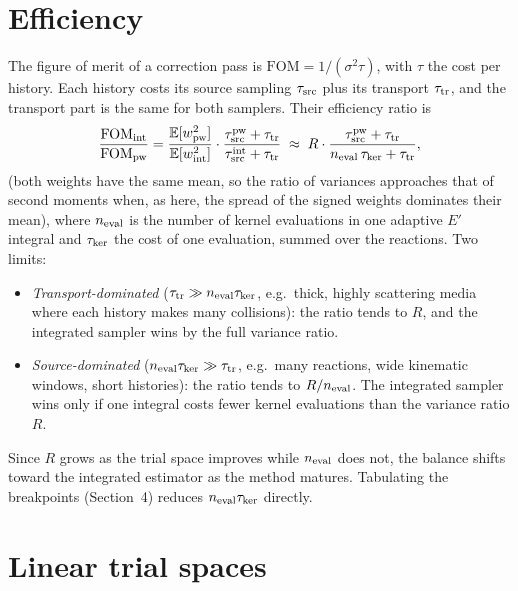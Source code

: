\documentclass[11pt]{article}
\newcommand{\E}{\mathbb{E}}
\begin{document}
\section{Efficiency}

The figure of merit of a correction pass is $\mathrm{FOM} = 1/(\sigma^2\tau)$, with
$\tau$ the cost per history. Each history costs its source sampling $\tau_{\rm src}$
plus its transport $\tau_{\rm tr}$, and the transport part is the same for both
samplers. Their efficiency ratio is
\begin{equation}
  \frac{\mathrm{FOM}_{\rm int}}{\mathrm{FOM}_{\rm pw}}
  = \frac{\E[w_{\rm pw}^2]}{\E[w_{\rm int}^2]}\cdot
    \frac{\tau^{\rm pw}_{\rm src}+\tau_{\rm tr}}{\tau^{\rm int}_{\rm src}+\tau_{\rm tr}}
  \;\approx\; R\cdot\frac{\tau^{\rm pw}_{\rm src}+\tau_{\rm tr}}
  {n_{\rm eval}\,\tau_{\rm ker}+\tau_{\rm tr}},
  \label{eq:fom}
\end{equation}
(both weights have the same mean, so the ratio of variances approaches that of second
moments when, as here, the spread of the signed weights dominates their mean), where
$n_{\rm eval}$ is the number of kernel evaluations in one adaptive $E'$ integral and
$\tau_{\rm ker}$ the cost of one evaluation, summed over the reactions. Two limits:
\begin{itemize}
  \item \emph{Transport-dominated} ($\tau_{\rm tr}\gg n_{\rm eval}\tau_{\rm ker}$, e.g.\
  thick, highly scattering media where each history makes many collisions): the ratio
  tends to $R$, and the integrated sampler wins by the full variance ratio.
  \item \emph{Source-dominated} ($n_{\rm eval}\tau_{\rm ker}\gg\tau_{\rm tr}$, e.g.\
  many reactions, wide kinematic windows, short histories): the ratio tends to
  $R/n_{\rm eval}$. The integrated sampler wins only if one integral costs fewer kernel
  evaluations than the variance ratio $R$.
\end{itemize}
Since $R$ grows as the trial space improves while $n_{\rm eval}$ does not, the balance
shifts toward the integrated estimator as the method matures. Tabulating the
breakpoints (Section~4) reduces $n_{\rm eval}\tau_{\rm ker}$ directly.

\section{Linear trial spaces}
\end{document}
